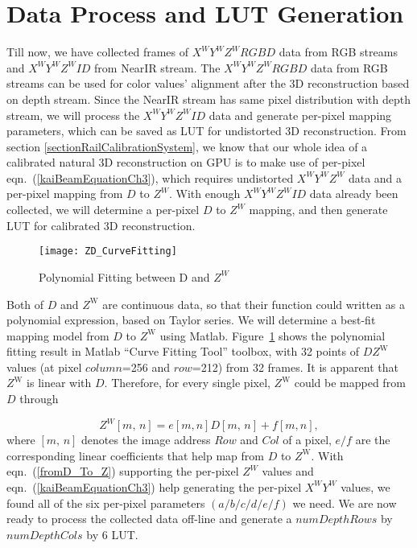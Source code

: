\section{Data Process and LUT Generation}
Till now, we have collected frames of \(X^WY^WZ^WRGBD\) data from RGB streams and \(X^WY^WZ^WID\) from NearIR stream. The \(X^WY^WZ^WRGBD\) data from RGB streams can be used for color values' alignment after the 3D reconstruction based on depth stream. Since the NearIR stream has same pixel distribution with depth stream, we will process the \(X^WY^WZ^WID\) data and generate per-pixel mapping parameters, which can be saved as LUT for undistorted 3D reconstruction. From section \ref{sectionRailCalibrationSystem}, we know that our whole idea of a calibrated natural 3D reconstruction on GPU is to make use of per-pixel eqn.~(\ref{kaiBeamEquationCh3}), which requires undistorted \(X^WY^WZ^W\) data and a per-pixel mapping from \(D\) to \(Z^W\). With enough \(X^WY^WZ^WID\) data already been collected, we will determine a per-pixel \(D\) to \(Z^W\) mapping, and then generate LUT for calibrated 3D reconstruction.
\\\indent
\begin{figure}[t]
\centering
\texttt{[image: ZD\_CurveFitting]}
\caption{Polynomial Fitting between D and \(Z^W\)}
\label{ZD_CurveFitting}
\end{figure}%
%
Both of \(D\) and \(Z^\text{W}\) are continuous data, so that their function could written as a polynomial expression, based on Taylor series. We will determine a best-fit mapping model from \(D\) to \(Z^\text{W}\) using Matlab. Figure~\ref{ZD_CurveFitting} shows the polynomial fitting result in Matlab \enquote{Curve Fitting Tool} toolbox, with 32 points of \(DZ^\text{W}\) values (at pixel \(column\)=256 and \(row\)=212) from 32 frames. It is apparent that \(Z^\text{W}\) is linear with \(D\). Therefore, for every single pixel, \(Z^\text{W}\) could be mapped from \(D\) through \par
%
\begin{equation}
Z^W[m, \, n] = e[m, n]D[m, \, n]+f[m, n] ,
\label{fromD_To_Z}
\end{equation}%
%
\noindent
where \([m, \, n]\) denotes the image address \(Row\) and \(Col\) of a pixel, \(e/f\) are the corresponding linear coefficients that help map from \(D\) to \(Z^\text{W}\). With eqn.~(\ref{fromD_To_Z}) supporting the per-pixel \(Z^W\) values and eqn.~(\ref{kaiBeamEquationCh3}) help generating the per-pixel \(X^WY^W\) values, we found all of the six per-pixel parameters \((a/b/c/d/e/f)\) we need. We are now ready to process the collected data off-line and generate a \(numDepthRows\) by \(numDepthCols\) by 6 LUT.

